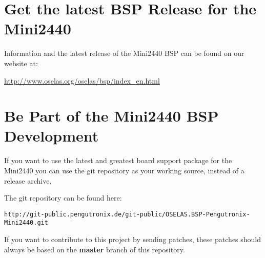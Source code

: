 \section{Get the latest BSP Release for the Mini2440}

Information and the latest release of the Mini2440 BSP can be found on
our website at:

\url{http://www.oselas.org/oselas/bsp/index\_en.html}


\section{Be Part of the Mini2440 BSP Development}

If you want to use the latest and greatest board support package for the
Mini2440 you can use the git repository as your working source, instead
of a release archive.

The git repository can be found here:

\begin{center}
\texttt{http://git-public.pengutronix.de/git-public/OSELAS.BSP-Pengutronix-Mini2440.git}
\end{center}

If you want to contribute to this project by sending patches, these patches
should always be based on the \textbf{master} branch of this repository.
